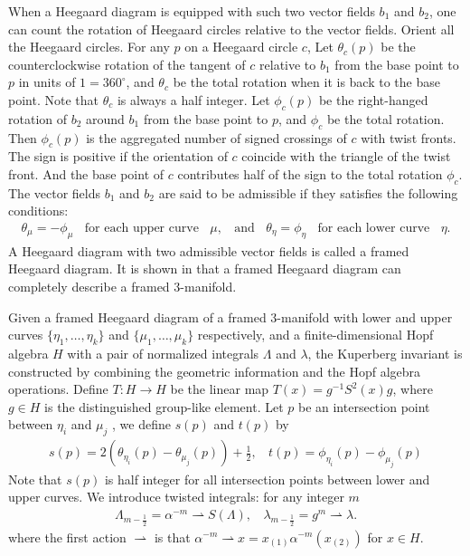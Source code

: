 \documentclass[12pt]{amsart}
\begin{document}
When a Heegaard diagram is equipped with such two vector fields $b_1$ and $b_2$, one can count the rotation of Heegaard circles relative to the vector fields. Orient all the Heegaard circles. For any $p$ on a Heegaard circle $c$, Let $\theta_c(p)$ be the counterclockwise rotation of the tangent of $c$ relative to $b_1$ from the base point to $p$ in units of $1=360^\circ$, and $\theta_c$ be the total rotation when it is back to the base point. Note that $\theta_c$ is always a half integer. Let $\phi_c(p)$ be the right-hanged rotation of $b_2$ around $b_1$ from the base point to $p$, and $\phi_c$ be the total rotation. Then $\phi_c(p)$ is the aggregated number of signed crossings of $c$ with twist fronts. The sign is positive if the orientation of $c$ coincide with the triangle of the twist front. And the base point of $c$ contributes half of the sign to the total rotation $\phi_c$. The vector fields $b_1$ and $b_2$ are said to be admissible if they satisfies the following conditions:
\[
\begin{aligned}
	\theta_\mu=-\phi_\mu~~~~\text{for each upper curve}~~~~ \mu,~~~~ 
	\text{and}~~~~\theta_\eta=\phi_\eta~~~~\text{for each lower curve}~~~~\eta.
\end{aligned}
\]  
A Heegaard diagram with two admissible vector fields is called a framed Heegaard diagram. It is shown in \cite{Kup96} that a framed Heegaard diagram can completely describe a framed 3-manifold.   

Given a framed Heegaard diagram of a framed 3-manifold with lower and upper curves $\{\eta_1, \ldots, \eta_k\}$ and $\{\mu_1, \ldots, \mu_k\}$ respectively, and a finite-dimensional Hopf algebra $H$ with a pair of normalized integrals $\Lambda$ and $\lambda$, the Kuperberg invariant is constructed by combining the geometric information and the Hopf algebra operations. Define $T: H\rightarrow H$ be the linear map $T(x)=g^{-1}S^2(x)g$, where $g\in H$ is the distinguished group-like element.  Let  $p$ be an intersection point between $\eta_i$ and $\mu_j$ , we define $s(p)$ and $t(p)$ by
\[\begin{aligned}
s(p)=2(\theta_{\eta_i}(p)-\theta_{\mu_j}(p))+\frac{1}{2},~~~~t(p)=\phi_{\eta_i}(p)-\phi_{\mu_j}(p)
\end{aligned}\]
Note that $s(p)$ is half integer for all intersection points between lower and upper curves. We introduce twisted integrals: for any integer $m$ 
\[\begin{aligned}
\Lambda_{m-\frac{1}{2}}=\alpha^{-m}\rightharpoonup S(\Lambda),~~~~\lambda_{m-\frac{1}{2}}=g^m\rightharpoonup \lambda.
\end{aligned}\]
where the first action $\rightharpoonup$ is that $\alpha^{-m}\rightharpoonup x=x_{(1)}\alpha^{-m}(x_{(2)})$ for $x\in H$.
\end{document}
